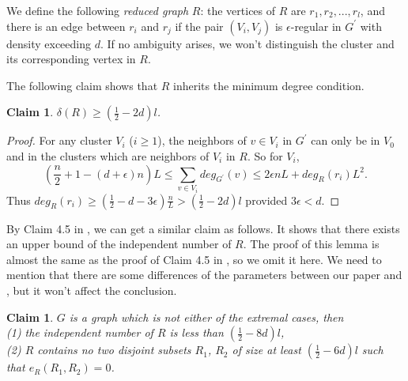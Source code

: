 \documentclass[11pt]{article}
\newtheorem{claim}[lemma]{Claim}
\begin{document}
We define the following {\em reduced graph} $R$: the vertices of $R$ are $r_1, r_2,..., r_l$, and there is an edge between $r_i$ and $r_j$ if the pair $(V_i, V_j)$ is $\epsilon $-regular in $G^{'}$ with density exceeding $d$. If no ambiguity arises, we won't distinguish the cluster and its corresponding vertex in $R$.

The following claim shows that $R$ inherits the minimum degree condition.

\begin{claim}\label{mdor}
$\delta (R)\geq (\frac{1}{2}-2d)l$.
\end{claim}

\begin{proof}
For any cluster $V_i$ ($i\geq 1$), the neighbors of $v\in V_i$ in $G^{'}$ can only be in $V_0$ and in the clusters which are neighbors of $V_i$ in $R$. So for $V_i$,
\begin{equation*}
(\frac{n}{2}+1-(d+\epsilon )n)L\leq \sum\limits_{v\in V_i}deg_{G^{'}}(v)\leq 2\epsilon nL+deg_{R}(r_i)L^2.
\end{equation*}
Thus $deg_{R}(r_i)\geq (\frac{1}{2}-d-3\epsilon )\frac{n}{L}>(\frac{1}{2}-2d)l$ provided $3\epsilon <d$.
\end{proof}

By Claim 4.5 in \cite{chen}, we can get a similar claim as follows. It shows that there exists an upper bound of the independent number of $R$. The proof of this lemma is almost the same as the proof of Claim 4.5 in \cite{chen}, so we omit it here. We need to mention that there are some differences of the parameters between our paper and \cite{chen}, but it won't affect the conclusion.

\begin{claim}\label{independent}
$G$ is a graph which is not either of the extremal cases, then \\
(1) the independent number of $R$ is less than $(\frac{1}{2}-8d)l$,\\
(2) $R$ contains no two disjoint subsets $R_1$, $R_2$ of size at least $(\frac{1}{2}-6d)l$ such that $e_R(R_1,R_2)=0$.
\end{claim}
\end{document}
